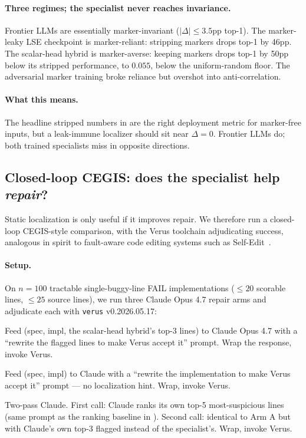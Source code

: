 \documentclass[10pt]{article}
\begin{document}
\paragraph{Three regimes; the specialist never reaches invariance.}
Frontier LLMs are essentially marker-invariant ($|\Delta| \le 3.5$pp
top-1). The marker-leaky LSE checkpoint is marker-reliant: stripping
markers drops top-1 by 46pp. The scalar-head hybrid is marker-averse:
keeping markers drops top-1 by 50pp below its stripped performance,
to $0.055$, below the uniform-random floor. The adversarial marker
training broke reliance but overshot into anti-correlation.

\paragraph{What this means.}
The headline stripped numbers in  are the
right deployment metric for marker-free inputs, but a leak-immune
localizer should sit near $\Delta=0$. Frontier LLMs do; both trained
specialists miss in opposite directions.

\subsection{Closed-loop CEGIS: does the specialist help \emph{repair}?}
\label{sec:results:cegis}

Static localization is only useful if it improves repair. We therefore
run a closed-loop CEGIS-style comparison, with the Verus toolchain
adjudicating success, analogous in spirit to fault-aware code editing
systems such as Self-Edit~\cite{zhang2023selfedit}.

\paragraph{Setup.} On $n=100$ tractable single-buggy-line FAIL
implementations ($\le 20$ scorable lines, $\le 25$ source lines), we
run three Claude Opus 4.7 repair arms and adjudicate each with
\texttt{verus} v0.2026.05.17:

\begin{description}[leftmargin=1.5em,itemsep=0pt]
\item[Arm A (specialist-guided):] Feed (spec, impl, the scalar-head hybrid's
  top-3 lines) to Claude Opus 4.7 with a ``rewrite the flagged
  lines to make Verus accept it'' prompt. Wrap the response,
  invoke Verus.
\item[Arm B (LLM-only resample):] Feed (spec, impl) to Claude
  with a ``rewrite the implementation to make Verus accept it''
  prompt --- no localization hint. Wrap, invoke Verus.
\item[Arm C (LLM-self-judged):] Two-pass Claude. First call:
  Claude ranks its own top-5 most-suspicious lines (same prompt
  as the ranking baseline in ). Second
  call: identical to Arm A but with Claude's own top-3 flagged
  instead of the specialist's. Wrap, invoke Verus.
\end{description}
\end{document}
